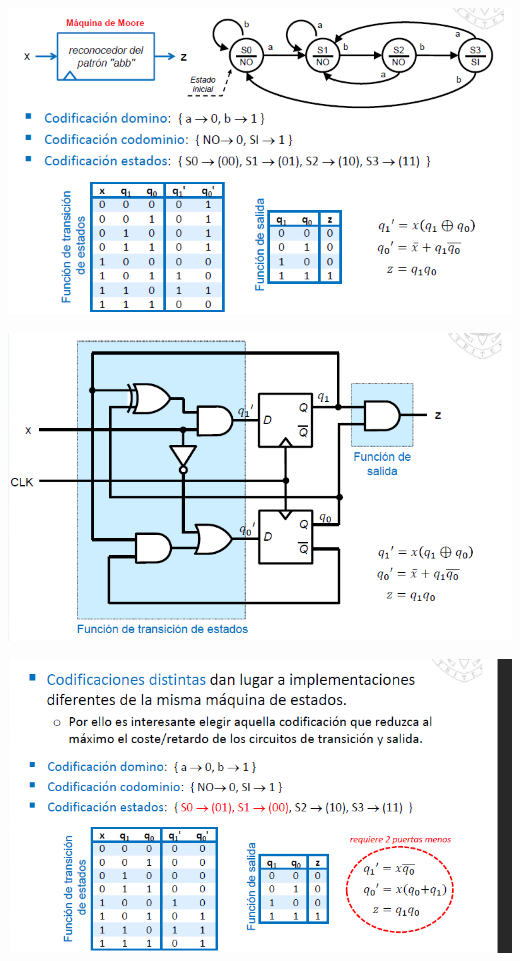\documentclass[a4paper,10pt]{book}
\begin{document}
\begin{center}
\includegraphics[scale=0.65]{Ejemplo1}
\end{center}
\begin{center}
\includegraphics[scale=0.65]{Ejemplo2}
\end{center}
\begin{center}
\includegraphics[scale=0.65]{Ejemplo3}
\end{center}
\end{document}
